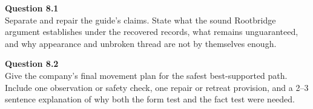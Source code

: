 \documentclass[12pt]{article}
\begin{document}
\textbf{Question 8.1}\\[-0.15em]
Separate and repair the guide's claims. State what the sound Rootbridge argument establishes under the recovered records, what remains unguaranteed, and why appearance and unbroken thread are not by themselves enough.

\textbf{Question 8.2}\\[-0.15em]
Give the company's final movement plan for the safest best-supported path. Include one observation or safety check, one repair or retreat provision, and a 2--3 sentence explanation of why both the form test and the fact test were needed.
\end{document}
